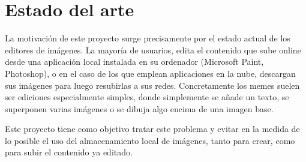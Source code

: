 \chapter{Estado del arte}

La motivación de este proyecto surge precisamente por el estado actual de los editores de imágenes. 
La mayoría de usuarios, edita el contenido que sube online desde una aplicación local instalada en su ordenador (Microsoft Paint, Photoshop), o en el caso de los que emplean aplicaciones en la nube, descargan sus imágenes para luego resubirlas a sus redes.
Concretamente los memes suelen ser ediciones especialmente simples, donde simplemente se añade un texto, se superponen varias imágenes o se dibuja algo encima de una imagen base.

Este proyecto tiene como objetivo tratar este problema y evitar en la medida de lo posible el uso del almacenamiento local de imágenes, tanto para crear, como para subir el contenido ya editado. 

